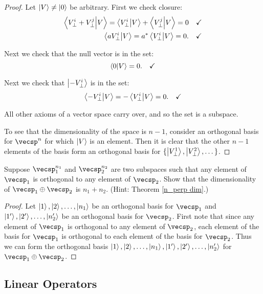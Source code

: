 \begin{proof}
Let $\ket{V} \neq \ket{0}$ be arbitrary. First we check closure:
\begin{align*}
    \braket{V_\perp^i + V_\perp^j}{V} = \braket{V_\perp^i}{V} + \braket{V_\perp^j}{V} = 0 \quad &\checkmark \\
    \braket{aV_\perp^i}{V} = a^*\braket{V_\perp^i}{V} = 0. \quad &\checkmark
\end{align*}

Next we check that the null vector is in the set:
\begin{equation*}
    \braket{0}{V} = 0. \quad \checkmark
\end{equation*}

Next we check that $\ket{-V_\perp^i}$ is in the set:
\begin{equation*}
    \braket{-V_\perp^i}{V} = -\braket{V_\perp^i}{V} = 0. \quad \checkmark
\end{equation*}

All other axioms of a vector space carry over, and so the set is a subspace.

To see that the dimensionality of the space is $n - 1$, consider an orthogonal basis for $\vecsp^n$ for which $\ket{V}$ is an element. Then it is clear that the other $n - 1$ elements of the basis form an orthogonal basis for $\{\ket{V_\perp^1}, \ket{V_\perp^2}, \dots\}$.
\end{proof}

\begin{exercise}
Suppose $\vecsp_1^{n_1}$ and $\vecsp_2^{n_2}$ are two subspaces such that any element of $\vecsp_1$ is orthogonal to any element of $\vecsp_2$. Show that the dimensionality of $\vecsp_1 \oplus \vecsp_2$ is $n_1 + n_2$. (Hint: Theorem \eqref{n_perp dim}.)
\end{exercise}

\begin{proof}
Let $\ket{1}, \ket{2}, \dots, \ket{n_1}$ be an orthogonal basis for $\vecsp_1$ and $\ket{1'}, \ket{2'}, \dots, \ket{n_2'}$ be an orthogonal basis for $\vecsp_2$. First note that since any element of $\vecsp_1$ is orthogonal to any element of $\vecsp_2$, each element of the basis for $\vecsp_1$ is orthogonal to each element of the basis for $\vecsp_2$. Thus we can form the orthogonal basis $\ket{1}, \ket{2}, \dots, \ket{n_1}, \ket{1'}, \ket{2'}, \dots, \ket{n_2'}$ for $\vecsp_1 \oplus \vecsp_2$.
\end{proof}

\subsection{Linear Operators}

